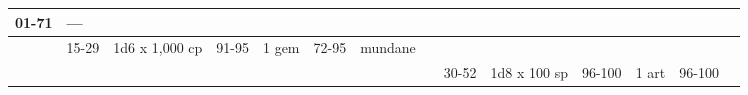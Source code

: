 \begin{longtable}{llllllllllllll}
{\begin{minipage}[t]{0.058in}
01-71\end{minipage}} & \multicolumn{1}{p{0.058in}|}{\begin{minipage}[t]{0.058in}\centering
---\end{minipage}}\\
\hline
\multicolumn{1}{p{0.058in}|}{\begin{minipage}[t]{0.058in}\centering
\end{minipage}} & \multicolumn{1}{|p{0.393in}|}{\begin{minipage}[t]{0.393in}\raggedright
15-29\end{minipage}} & \multicolumn{1}{p{0.469in}|}{\begin{minipage}[t]{0.469in}\raggedright
1d6 x 1,000 cp\end{minipage}} & \multicolumn{1}{p{0.923in}|}{\begin{minipage}[t]{0.923in}\raggedright
91-95\end{minipage}} & \multicolumn{1}{p{0.469in}|}{\begin{minipage}[t]{0.469in}\raggedright
1 gem\end{minipage}} & \multicolumn{1}{p{0.626in}|}{\begin{minipage}[t]{0.626in}\raggedright
72-95\end{minipage}} & \multicolumn{1}{p{0.469in}|}{\begin{minipage}[t]{0.469in}\centering
1 mundane\end{minipage}}\\
\hline
\multicolumn{8}{p{1.150in}|}{\begin{minipage}[t]{1.150in}\centering
\end{minipage}} & \multicolumn{1}{p{0.058in}|}{\begin{minipage}[t]{0.058in}\raggedright
30-52\end{minipage}} & \multicolumn{1}{p{0.058in}|}{\begin{minipage}[t]{0.058in}\raggedright
1d8 x 100 sp\end{minipage}} & \multicolumn{1}{p{0.058in}|}{\begin{minipage}[t]{0.058in}\raggedright
96-100\end{minipage}} & \multicolumn{1}{p{0.058in}|}{\begin{minipage}[t]{0.058in}\raggedright
1 art\end{minipage}} & \multicolumn{1}{p{0.058in}|}{\begin{minipage}[t]{0.058in}\raggedright
96-100\end{minipage}} & \multicolumn{1}{p{0.058in}|}{\begin{minipage}[t]{0.058in}\centering

\end{minipage}}
\end{longtable}
